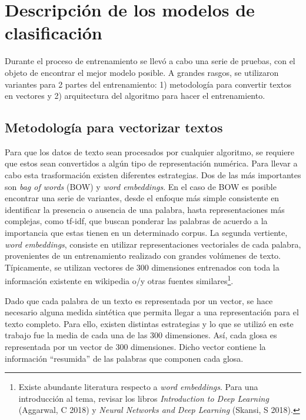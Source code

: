 \documentclass[
  12pt,
  spanish,
]{article}
\begin{document}
\hypertarget{descripciuxf3n-de-los-modelos-de-clasificaciuxf3n}{%
\section{Descripción de los modelos de
clasificación}\label{descripciuxf3n-de-los-modelos-de-clasificaciuxf3n}}

Durante el proceso de entrenamiento se llevó a cabo una serie de
pruebas, con el objeto de encontrar el mejor modelo posible. A grandes
rasgos, se utilizaron variantes para 2 partes del entrenamiento: 1)
metodología para convertir textos en vectores y 2) arquitectura del
algoritmo para hacer el entrenamiento.

\hypertarget{metodologuxeda-para-vectorizar-textos}{%
\subsection{\texorpdfstring{Metodología para vectorizar textos
\label{introduction}}{Metodología para vectorizar textos }}\label{metodologuxeda-para-vectorizar-textos}}

Para que los datos de texto sean procesados por cualquier algoritmo, se
requiere que estos sean convertidos a algún tipo de representación
numérica. Para llevar a cabo esta trasformación existen diferentes
estrategias. Dos de las más importantes son \emph{bag of words} (BOW) y
\emph{word embeddings}. En el caso de BOW es posible encontrar una serie
de variantes, desde el enfoque más simple consistente en identificar la
presencia o ausencia de una palabra, hasta representaciones más
complejas, como tf-idf, que buscan ponderar las palabras de acuerdo a la
importancia que estas tienen en un determinado corpus. La segunda
vertiente, \emph{word embeddings}, consiste en utilizar representaciones
vectoriales de cada palabra, provenientes de un entrenamiento realizado
con grandes volúmenes de texto. Típicamente, se utilizan vectores de 300
dimensiones entrenados con toda la información existente en wikipedia
o/y otras fuentes similares\footnote{Existe abundante literatura
  respecto a \emph{word embeddings}. Para una introducción al tema,
  revisar los libros \emph{Introduction to Deep Learning} (Aggarwal, C
  2018) y \emph{Neural Networks and Deep Learning} (Skansi, S 2018).}.

Dado que cada palabra de un texto es representada por un vector, se hace
necesario alguna medida sintética que permita llegar a una
representación para el texto completo. Para ello, existen distintas
estrategias y lo que se utilizó en este trabajo fue la media de cada una
de las 300 dimensiones. Así, cada glosa es representada por un vector de
300 dimensiones. Dicho vector contiene la información ``resumida'' de
las palabras que componen cada glosa.
\end{document}
